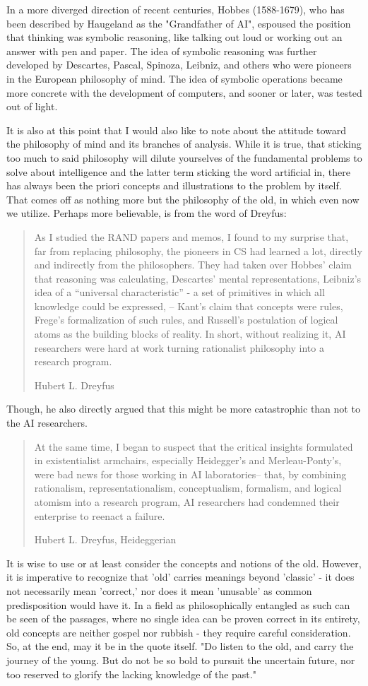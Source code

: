In a more diverged direction of recent centuries, Hobbes (1588-1679), who has been described by Haugeland as the "Grandfather of AI", espoused the position that thinking was symbolic reasoning, like talking out loud or working out an answer with pen and paper. The idea of symbolic reasoning was further developed by Descartes, Pascal, Spinoza, Leibniz, and others who were pioneers in the European philosophy of mind. The idea of symbolic operations became more concrete with the development of computers, and sooner or later, was tested out of light. 

It is also at this point that I would also like to note about the attitude toward the philosophy of mind and its branches of analysis. While it is true, that sticking too much to said philosophy will dilute yourselves of the fundamental problems to solve about intelligence and the latter term sticking the word artificial in, there has always been the priori concepts and illustrations to the problem by itself. That comes off as nothing more but the philosophy of the old, in which even now we utilize. Perhaps more believable, is from the word of Dreyfus: 
\blockquote[Hubert L. Dreyfus]{As I studied the RAND papers and memos, I found to my surprise that, far from replacing philosophy, the pioneers in CS had learned a lot, directly and indirectly from the philosophers. They had taken over Hobbes' claim that reasoning was calculating, Descartes' mental representations, Leibniz's idea of a “universal characteristic” - a set of primitives in which all knowledge could be expressed, -- Kant's claim that concepts were rules, Frege's formalization of such rules, and Russell's postulation of logical atoms as the building blocks of reality. In short, without realizing it, AI researchers were hard at work turning rationalist philosophy into a research program.}

Though, he also directly argued that this might be more catastrophic than not to the AI researchers. 
\blockquote[Hubert L. Dreyfus, Heideggerian]{At the same time, I began to suspect that the critical insights formulated in existentialist armchairs, especially Heidegger's and Merleau-Ponty's, were bad news for those working in AI laboratories-- that, by combining rationalism, representationalism, conceptualism, formalism, and logical atomism into a research program, AI researchers had condemned their enterprise to reenact a failure.}

It is wise to use or at least consider the concepts and notions of the old. However, it is imperative to recognize that 'old' carries meanings beyond 'classic' - it does not necessarily mean 'correct,' nor does it mean 'unusable' as common predisposition would have it. In a field as philosophically entangled as such can be seen of the passages, where no single idea can be proven correct in its entirety, old concepts are neither gospel nor rubbish - they require careful consideration. So, at the end, may it be in the quote itself. "Do listen to the old, and carry the journey of the young. But do not be so bold to pursuit the uncertain future, nor too reserved to glorify the lacking knowledge of the past."


